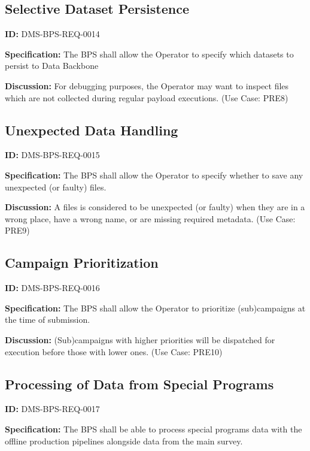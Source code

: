 \documentclass[SE,toc,lsstdraft]{lsstdoc}
\begin{document}
\subsection{Selective Dataset Persistence}

\label{DMS-BPS-REQ-0014}
\textbf{ID:} DMS-BPS-REQ-0014

\textbf{Specification:}
The BPS shall allow the Operator to specify which datasets to persist to Data Backbone

\textbf{Discussion:}
For debugging purposes, the Operator may want to inspect files which are not collected during regular payload executions.  (Use Case: PRE8)

\subsection{Unexpected Data Handling}

\label{DMS-BPS-REQ-0015}
\textbf{ID:} DMS-BPS-REQ-0015

\textbf{Specification:}
The BPS shall allow the Operator to specify whether to save any unexpected (or faulty) files.

\textbf{Discussion:}
A files is considered to be unexpected (or faulty) when they are in a wrong place, have a wrong name, or are missing required metadata.  (Use Case: PRE9)

\subsection{Campaign Prioritization}

\label{DMS-BPS-REQ-0016}
\textbf{ID:} DMS-BPS-REQ-0016

\textbf{Specification:}
The BPS shall allow the Operator to prioritize (sub)campaigns at the time of submission.

\textbf{Discussion:}
(Sub)campaigns with higher priorities will be dispatched for execution before those with lower ones.  (Use Case: PRE10)

\subsection{Processing of Data from Special Programs}

\label{DMS-BPS-REQ-0017}
\textbf{ID:} DMS-BPS-REQ-0017

\textbf{Specification:}
The BPS shall be able to process special programs data with the offline production pipelines alongside data from the main survey.
\end{document}
